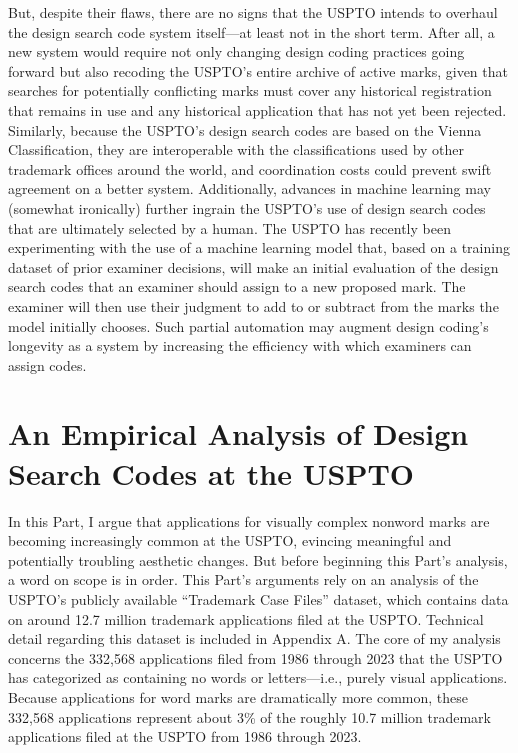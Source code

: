 \documentclass[letterpaper, 11pt, oneside]{article}
\begin{document}
But, despite their flaws, there are no signs that the USPTO intends to overhaul the design search code system itself—at least not in the short term. After all, a new system would require not only changing design coding practices going forward but also recoding the USPTO's entire archive of active marks, given that searches for potentially conflicting marks must cover any historical registration that remains in use and any historical application that has not yet been rejected. Similarly, because the USPTO's design search codes are based on the Vienna Classification, they are interoperable with the classifications used by other trademark offices around the world, and coordination costs could prevent swift agreement on a better system. Additionally, advances in machine learning may (somewhat ironically) further ingrain the USPTO's use of design search codes that are ultimately selected by a human. The USPTO has recently been experimenting with the use of a machine learning model that, based on a training dataset of prior examiner decisions, will make an initial evaluation of the design search codes that an examiner should assign to a new proposed mark. The examiner will then use their judgment to add to or subtract from the marks the model initially chooses. Such partial automation may augment design coding's longevity as a system by increasing the efficiency with which examiners can assign codes.

\section{An Empirical Analysis of Design Search Codes at the USPTO}\label{sec:2}

In this Part, I argue that applications for visually complex nonword marks are becoming increasingly common at the USPTO, evincing meaningful and potentially troubling aesthetic changes. But before beginning this Part's analysis, a word on scope is in order. This Part's arguments rely on an analysis of the USPTO's publicly available ``Trademark Case Files'' dataset, which contains data on around 12.7 million trademark applications filed at the USPTO. Technical detail regarding this dataset is included in Appendix A. The core of my analysis concerns the 332,568 applications filed from 1986 through 2023 that the USPTO has categorized as containing no words or letters—i.e., purely visual applications. Because applications for word marks are dramatically more common, these 332,568 applications represent about 3\% of the roughly 10.7 million trademark applications filed at the USPTO from 1986 through 2023.
\end{document}

